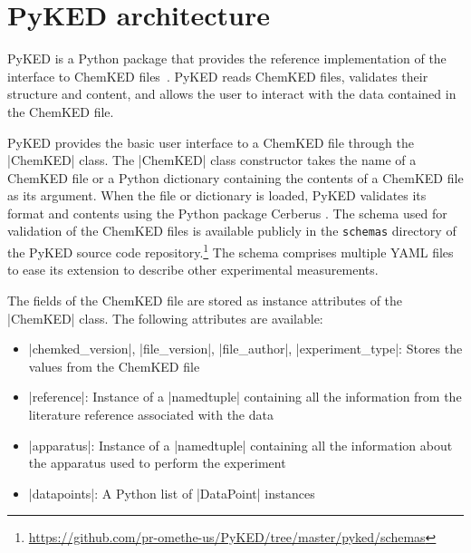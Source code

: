\documentclass[12pt]{ijck}
\newcommand\ck{ChemKED}
\newcommand\pk{PyKED}
\begin{document}
\section{PyKED architecture}\label{sec:pyked-architecture}
%
\pk{} is a Python package that provides the reference implementation
of the interface to \ck{} files~\autocite{PyKED}. \pk{} reads \ck{} files, validates
their structure and content, and allows the user to interact with the data contained
in the \ck{} file.

\pk{} provides the basic user interface to a \ck{} file through the
\pybox|ChemKED| class. The \pybox|ChemKED| class constructor takes the name
of a \ck{} file or a Python dictionary containing the contents of a \ck{} file
as its argument. When the file or dictionary is loaded, \pk{} validates its
format and contents using the Python package Cerberus \autocite{cerberus}. The
schema used for validation of the \ck{} files is available publicly in the
\texttt{schemas} directory of the PyKED source code
repository.\footnote{\url{https://github.com/pr-omethe-us/PyKED/tree/master/pyked/schemas}}
The schema comprises multiple YAML files to ease its extension to describe other
experimental measurements.

The fields of the \ck{} file are stored as instance attributes of the
\pybox|ChemKED| class. The following attributes are available:
%
\begin{itemize}
    \item \pybox|chemked_version|, \pybox|file_version|, \pybox|file_author|,
    \pybox|experiment_type|: Stores the values from the \ck{} file
    \item \pybox|reference|: Instance of a \pybox|namedtuple| containing all
    the information from the literature reference associated with the data
    \item \pybox|apparatus|: Instance of a \pybox|namedtuple| containing all
    the information about the apparatus used to perform the experiment
    \item \pybox|datapoints|: A Python list of \pybox|DataPoint| instances
\end{itemize}
\end{document}
